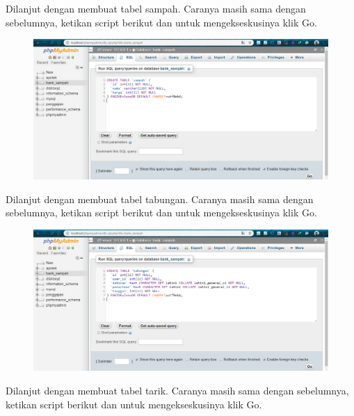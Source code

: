 \noindent
Dilanjut dengan membuat tabel sampah. Caranya masih sama dengan sebelumnya, ketikan script berikut dan untuk mengekseskusinya klik Go.



\begin{figure}[H]
\centering
\includegraphics[width=1\textwidth]{figures/database/6.png}
\end{figure}

\noindent
Dilanjut dengan membuat tabel tabungan. Caranya masih sama dengan sebelumnya, ketikan script berikut dan untuk mengekseskusinya klik Go.



\begin{figure}[H]
\centering
\includegraphics[width=1\textwidth]{figures/database/7.png}
\end{figure}

\noindent
Dilanjut dengan membuat tabel tarik. Caranya masih sama dengan sebelumnya, ketikan script berikut dan untuk mengekseskusinya klik Go.



